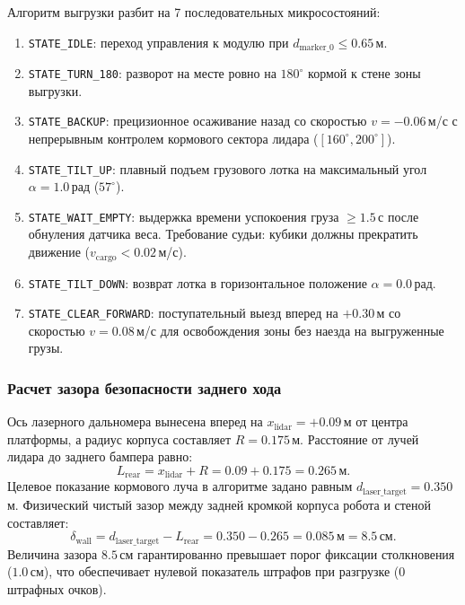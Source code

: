 \documentclass[a4paper,11pt]{article}
\begin{document}
Алгоритм выгрузки разбит на 7 последовательных микросостояний:
\begin{enumerate}
    \item \texttt{STATE\_IDLE}: переход управления к модулю при $d_{\text{marker\_0}} \le 0.65$\,м.
    \item \texttt{STATE\_TURN\_180}: разворот на месте ровно на $180^\circ$ кормой к стене зоны выгрузки.
    \item \texttt{STATE\_BACKUP}: прецизионное осаживание назад со скоростью $v = -0.06$\,м/с с непрерывным контролем кормового сектора лидара ($[160^\circ, 200^\circ]$).
    \item \texttt{STATE\_TILT\_UP}: плавный подъем грузового лотка на максимальный угол $\alpha = 1.0$\,рад ($57^\circ$).
    \item \texttt{STATE\_WAIT\_EMPTY}: выдержка времени успокоения груза $\ge 1.5$\,с после обнуления датчика веса. Требование судьи: кубики должны прекратить движение ($v_{\text{cargo}} < 0.02$\,м/с).
    \item \texttt{STATE\_TILT\_DOWN}: возврат лотка в горизонтальное положение $\alpha = 0.0$\,рад.
    \item \texttt{STATE\_CLEAR\_FORWARD}: поступательный выезд вперед на $+0.30$\,м со скоростью $v = 0.08$\,м/с для освобождения зоны без наезда на выгруженные грузы.
\end{enumerate}

\subsubsection{Расчет зазора безопасности заднего хода}
Ось лазерного дальномера вынесена вперед на $x_{\text{lidar}} = +0.09$\,м от центра платформы, а радиус корпуса составляет $R = 0.175$\,м. Расстояние от лучей лидара до заднего бампера равно:
\begin{equation}
L_{\text{rear}} = x_{\text{lidar}} + R = 0.09 + 0.175 = 0.265\,\text{м}.
\end{equation}
Целевое показание кормового луча в алгоритме задано равным $d_{\text{laser\_target}} = 0.350$\,м. Физический чистый зазор между задней кромкой корпуса робота и стеной составляет:
\begin{equation}
\delta_{\text{wall}} = d_{\text{laser\_target}} - L_{\text{rear}} = 0.350 - 0.265 = 0.085\,\text{м} = 8.5\,\text{см}.
\end{equation}
Величина зазора $8.5$\,см гарантированно превышает порог фиксации столкновения ($1.0$\,см), что обеспечивает нулевой показатель штрафов при разгрузке ($0$ штрафных очков).
\end{document}
